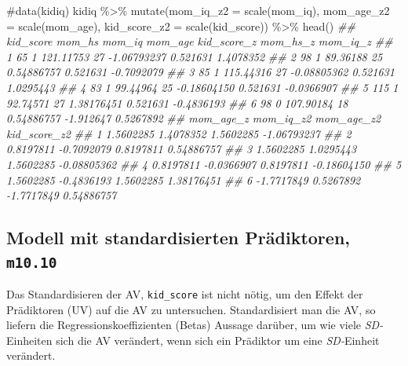 \documentclass[
  a4paper,
  DIV=11]{scrreprt}
\newenvironment{Shaded}{\begin{snugshade}}{\end{snugshade}}
\newcommand{\AttributeTok}[1]{\textcolor[rgb]{0.40,0.45,0.13}{#1}}
\newcommand{\CommentTok}[1]{\textcolor[rgb]{0.37,0.37,0.37}{#1}}
\newcommand{\DocumentationTok}[1]{\textcolor[rgb]{0.37,0.37,0.37}{\textit{#1}}}
\newcommand{\FunctionTok}[1]{\textcolor[rgb]{0.28,0.35,0.67}{#1}}
\newcommand{\NormalTok}[1]{\textcolor[rgb]{0.00,0.23,0.31}{#1}}
\newcommand{\SpecialCharTok}[1]{\textcolor[rgb]{0.37,0.37,0.37}{#1}}
\theoremstyle{definition}
\theoremstyle{remark}
\begin{document}
\begin{Shaded}
\begin{Highlighting}[]
\CommentTok{\#data(kidiq)}
\NormalTok{kidiq }\SpecialCharTok{\%\textgreater{}\%} 
  \FunctionTok{mutate}\NormalTok{(}\AttributeTok{mom\_iq\_z2 =} \FunctionTok{scale}\NormalTok{(mom\_iq),}
         \AttributeTok{mom\_age\_z2 =} \FunctionTok{scale}\NormalTok{(mom\_age),}
         \AttributeTok{kid\_score\_z2 =} \FunctionTok{scale}\NormalTok{(kid\_score)) }\SpecialCharTok{\%\textgreater{}\%} 
  \FunctionTok{head}\NormalTok{()}
\DocumentationTok{\#\#   kid\_score mom\_hs    mom\_iq mom\_age kid\_score\_z  mom\_hs\_z   mom\_iq\_z}
\DocumentationTok{\#\# 1        65      1 121.11753      27 {-}1.06793237  0.521631  1.4078352}
\DocumentationTok{\#\# 2        98      1  89.36188      25  0.54886757  0.521631 {-}0.7092079}
\DocumentationTok{\#\# 3        85      1 115.44316      27 {-}0.08805362  0.521631  1.0295443}
\DocumentationTok{\#\# 4        83      1  99.44964      25 {-}0.18604150  0.521631 {-}0.0366907}
\DocumentationTok{\#\# 5       115      1  92.74571      27  1.38176451  0.521631 {-}0.4836193}
\DocumentationTok{\#\# 6        98      0 107.90184      18  0.54886757 {-}1.912647  0.5267892}
\DocumentationTok{\#\#    mom\_age\_z  mom\_iq\_z2 mom\_age\_z2 kid\_score\_z2}
\DocumentationTok{\#\# 1  1.5602285  1.4078352  1.5602285  {-}1.06793237}
\DocumentationTok{\#\# 2  0.8197811 {-}0.7092079  0.8197811   0.54886757}
\DocumentationTok{\#\# 3  1.5602285  1.0295443  1.5602285  {-}0.08805362}
\DocumentationTok{\#\# 4  0.8197811 {-}0.0366907  0.8197811  {-}0.18604150}
\DocumentationTok{\#\# 5  1.5602285 {-}0.4836193  1.5602285   1.38176451}
\DocumentationTok{\#\# 6 {-}1.7717849  0.5267892 {-}1.7717849   0.54886757}
\end{Highlighting}
\end{Shaded}

\hypertarget{modell-mit-standardisierten-pruxe4diktoren-m10.10}{%
\subsection{\texorpdfstring{Modell mit standardisierten Prädiktoren,
\texttt{m10.10}}{Modell mit standardisierten Prädiktoren, m10.10}}\label{modell-mit-standardisierten-pruxe4diktoren-m10.10}}

Das Standardisieren der AV, \texttt{kid\_score} ist nicht nötig, um den
Effekt der Prädiktoren (UV) auf die AV zu untersuchen. Standardisiert
man die AV, so liefern die Regressionskoeffizienten (Betas) Aussage
darüber, um wie viele \emph{SD-}Einheiten sich die AV verändert, wenn
sich ein Prädiktor um eine \emph{SD-}Einheit verändert.
\end{document}
